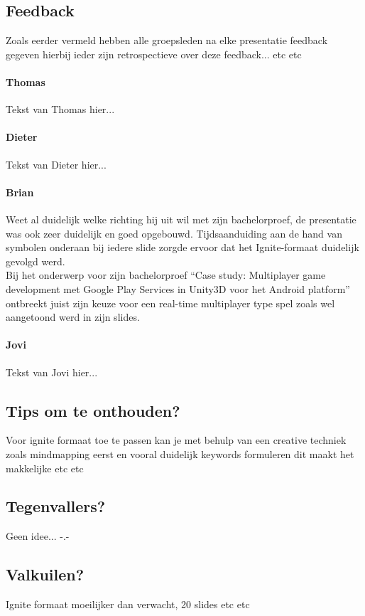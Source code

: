 \documentclass[fleqn,10pt]{voorstel}
\begin{document}
\subsection{Feedback}
Zoals eerder vermeld hebben alle groepsleden na elke presentatie feedback gegeven hierbij ieder zijn retrospectieve over deze feedback... etc etc

\paragraph{Thomas}
Tekst van Thomas hier...

\paragraph{Dieter}
Tekst van Dieter hier...

\paragraph{Brian}
Weet al duidelijk welke richting hij uit wil met zijn bachelorproef, de presentatie was ook zeer duidelijk en goed opgebouwd. Tijdsaanduiding aan de hand van symbolen onderaan bij iedere slide zorgde ervoor dat het Ignite-formaat duidelijk gevolgd werd.\\
Bij het onderwerp voor zijn bachelorproef “Case study: Multiplayer game development met Google Play Services in Unity3D voor het Android platform” ontbreekt juist zijn keuze voor een real-time multiplayer type spel zoals wel aangetoond werd in zijn slides.

\paragraph{Jovi}
Tekst van Jovi hier...

\subsection{Tips om te onthouden?}
Voor ignite formaat toe te passen kan je met behulp van een creative techniek zoals mindmapping eerst en vooral 
duidelijk keywords formuleren dit maakt het makkelijke etc etc

\subsection{Tegenvallers?}
Geen idee... -.-

\subsection{Valkuilen?}
Ignite formaat moeilijker dan verwacht, 20 slides etc etc
\end{document}
